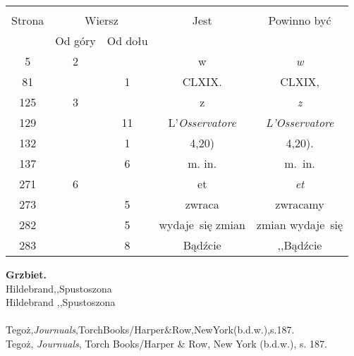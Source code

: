 \documentclass[a4paper,11pt]{article}
\begin{document}
\vspace{\spaceFour}



\begin{center}
  \begin{tabular}{|c|c|c|c|c|}
    \hline
    & \multicolumn{2}{c|}{} & & \\
    Strona & \multicolumn{2}{c|}{Wiersz} & Jest
                              & Powinno być \\ \cline{2-3}
    & Od góry & Od dołu & & \\
    \hline
    5   &  2 & & w & \emph{w} \\
    81  & &  1 & CLXIX. & CLXIX, \\
    125 &  3 & & z & \emph{z} \\
    129 & & 11 & L'\emph{Osservatore} & \emph{L'Osservatore} \\
    132 & &  1 & 4,20) & 4,20). \\
    137 & &  6 & m.\hspace{1em} in. & m.~in.\\
    271 &  6 & & et & \emph{et} \\
    273 & &  5 & zwraca & zwracamy \\
    282 & &  5 & wydaje~się zmian & zmian wydaje~się \\
    283 & &  8 & Bądźcie & ,,Bądźcie  %
    \\
    \hline
  \end{tabular}
\end{center}
\noindent
\textbf{Grzbiet.} \\
\Jest Hildebrand,,Spustoszona \\ %
\Powin Hildebrand ,,Spustoszona \\ %
 \\
\Jest  Tegoż,\emph{Journuals},TorchBooks/Harper{\&}Row,NewYork(b.d.w.),s.187. \\
\Powin Tegoż, \emph{Journuals}, Torch Books/Harper \& Row, New York
(b.d.w.), s. 187. \\


\vspace{\spaceTwo}










\newpage
\end{document}

